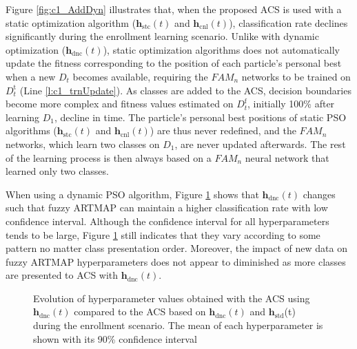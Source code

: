 Figure \ref{fig:c1_AddDyn} illustrates that, when the proposed ACS is used with a static optimization algorithm ($\textbf{h}_\text{stc}(t)$ and $\textbf{h}_\text{cnl}(t)$), classification rate declines significantly during the enrollment learning scenario. Unlike with dynamic optimization ($\textbf{h}_\text{dnc}(t)$), static optimization algorithms does not automatically update the fitness corresponding to the position of each particle's personal best when a new $D_t$ becomes available, requiring the $\textit{FAM}_n$ networks to be trained on $D_t^\text{t}$ (Line \ref{l:c1_trnUpdate}). As classes are added to the ACS, decision boundaries become more complex and fitness values estimated on $D_t^\text{f}$, initially 100\% after learning $D_1$, decline in time. The particle's personal best positions of static PSO algorithms ($\textbf{h}_\text{stc}(t)$ and $\textbf{h}_\text{cnl}(t)$) are thus never redefined, and the $\textit{FAM}_n$ networks, which learn two classes on $D_1$, are never updated afterwards. The rest of the learning process is then always based on a $\textit{FAM}_n$ neural network that learned only two classes.

When using a dynamic PSO algorithm, Figure \ref{fig:c1_AddDynHp} shows that $\textbf{h}_\text{dnc}(t)$ changes such that fuzzy ARTMAP can maintain a higher classification rate with low confidence interval. Although the confidence interval for all hyperparameters tends to be large, Figure \ref{fig:c1_AddDynHp} still indicates that they vary according to some pattern no matter class presentation order. Moreover, the impact of new data on fuzzy ARTMAP hyperparameters does not appear to diminished as more classes are presented to ACS with $\textbf{h}_\text{dnc}(t)$.

\begin{figure}[t]
  \centering
  \caption{ Evolution of hyperparameter values obtained with the ACS using $\textbf{h}_\text{dnc}(t)$ compared to the ACS based on $\textbf{h}_\text{dnc}(t)$ and $\textbf{h}_\text{std}$(t) during the enrollment scenario. The mean of each hyperparameter is shown with its 90\% confidence interval}
	\label{fig:c1_AddDynHp}
\end{figure}

